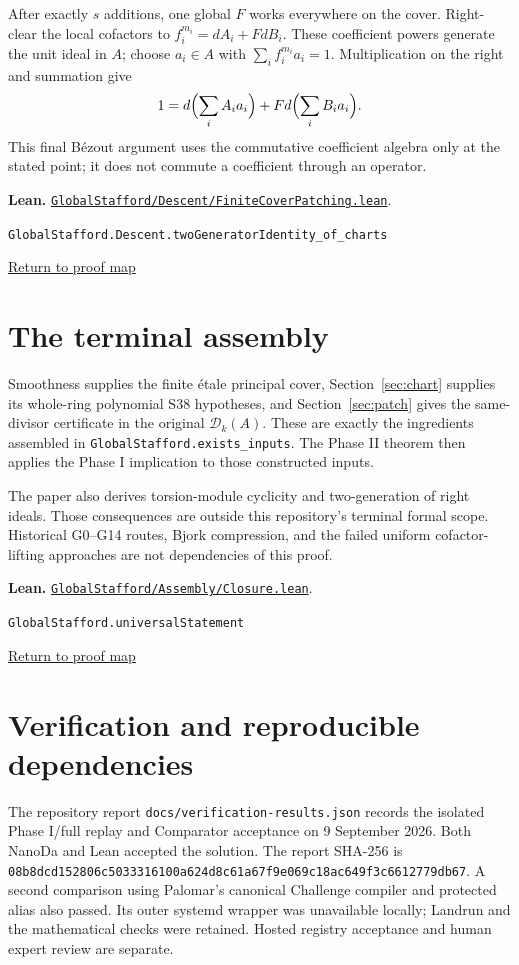 \documentclass[11pt,a4paper]{article}
\newcommand{\code}[1]{\nolinkurl{#1}}
\newcommand{\D}{\mathcal D}
\newcommand{\backmap}{\hfill\hyperref[fig:map]{\small Return to proof map}}
\newcommand{\leanref}[2]{\par\smallskip\noindent\textbf{Lean.} \href{https://github.com/itpplasma/global-stafford-formal/blob/b21883a5b3d8f46922713049c3b060523ea3a771/#1}{\nolinkurl{#1}}.\par\noindent\small\code{#2}\par\normalsize\backmap}
\begin{document}
After exactly $s$ additions, one global $F$ works everywhere on the cover.
Right-clear the local cofactors to
$f_i^{m_i}=dA_i+FdB_i$. These coefficient powers generate the unit ideal in $A$;
choose $a_i\in A$ with $\sum_i f_i^{m_i}a_i=1$. Multiplication on the right and
summation give
\[
 1=d\Bigl(\sum_i A_i a_i\Bigr)+Fd\Bigl(\sum_i B_i a_i\Bigr).
\]
This final B\'ezout argument uses the commutative coefficient algebra only at
the stated point; it does not commute a coefficient through an operator.
\leanref{GlobalStafford/Descent/FiniteCoverPatching.lean}{GlobalStafford.Descent.twoGeneratorIdentity_of_charts}

\section{The terminal assembly}\label{sec:terminal}
Smoothness supplies the finite \'etale principal cover, Section~\ref{sec:chart}
supplies its whole-ring polynomial S38 hypotheses, and
Section~\ref{sec:patch} gives the same-divisor certificate in the original
$\D_k(A)$. These are exactly the ingredients assembled in
\code{GlobalStafford.exists_inputs}. The Phase II theorem then applies the
Phase I implication to those constructed inputs.

The paper also derives torsion-module cyclicity and two-generation of right
ideals. Those consequences are outside this repository's terminal formal
scope. Historical G0--G14 routes, Bjork compression, and the failed uniform
cofactor-lifting approaches are not dependencies of this proof.
\leanref{GlobalStafford/Assembly/Closure.lean}{GlobalStafford.universalStatement}

\section{Verification and reproducible dependencies}\label{sec:verification}
The repository report \code{docs/verification-results.json} records the
isolated Phase I/full replay and Comparator acceptance on 9 September 2026.
Both NanoDa and Lean accepted the solution. The report SHA-256 is
\nolinkurl{08b8dcd152806c5033316100a624d8c61a67f9e069c18ac649f3c6612779db67}.
A second comparison using Palomar's canonical Challenge compiler and protected
alias also passed. Its outer systemd wrapper was unavailable locally;
Landrun and the mathematical checks were retained. Hosted registry acceptance
and human expert review are separate.
\end{document}
